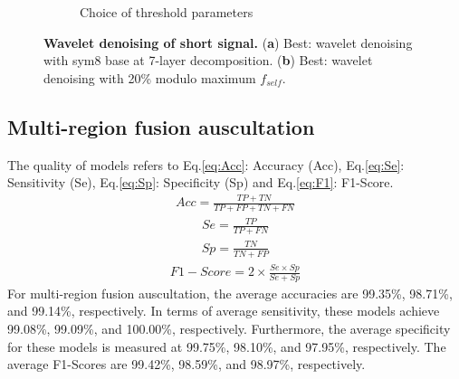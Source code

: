 \begin{figure}[htbp]
\begin{subfigure}{1\linewidth}
		\caption{Choice of threshold parameters}
		\label{FIG:wavelet.b}%
	\end{subfigure}
\caption{\textbf{Wavelet denoising of short signal.} (\textbf{a}) Best: wavelet denoising with sym8 base at 7-layer decomposition. (\textbf{b}) Best: wavelet denoising with 20\% modulo maximum $f_{self}$.}
\label{FIG:wavelet}
\end{figure}
\subsection{Multi-region fusion auscultation}
The quality of models refers to Eq.\ref{eq:Acc}: Accuracy (Acc), Eq.\ref{eq:Se}: Sensitivity (Se),  Eq.\ref{eq:Sp}: Specificity (Sp) and Eq.\ref{eq:F1}: F1-Score.
\begin{equation}
\begin{split}
    Acc= \frac{TP+TN}{TP+FP+TN+FN}
\end{split}
\label{eq:Acc}
\end{equation}
\begin{equation}
\begin{split}
	Se=   \frac{TP}{TP+FN}
\end{split}
\label{eq:Se}
\end{equation}
\begin{equation}
\begin{split}
  Sp=  \frac{TN}{TN+FP}
\end{split}
\label{eq:Sp}
\end{equation}
\begin{equation}
\begin{split}
  F1-Score= 2\times\frac{Se\times Sp}{Se+Sp} 
\end{split}
\label{eq:F1}
\end{equation}
For multi-region fusion auscultation, the average accuracies are 99.35\%, 98.71\%, and 99.14\%, respectively. In terms of average sensitivity, these models achieve 99.08\%, 99.09\%, and 100.00\%, respectively. Furthermore, the average specificity for these models is measured at 99.75\%, 98.10\%, and 97.95\%, respectively. The average F1-Scores are 99.42\%, 98.59\%, and 98.97\%, respectively.


